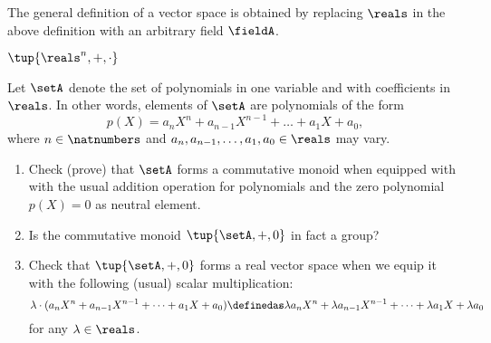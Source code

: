 \begin{remark}
    The general definition of a vector space is obtained by replacing $\reals$ in the above definition with an arbitrary field $\fieldA$.
\end{remark}

\begin{example}
    $\tup{\reals^n, +, \cdot}$
\end{example}



\begin{gradedexercise}
    \label{ex:real-polynomials}

    Let $\setA$ denote the set of polynomials in one variable and with coefficients in $\reals$.
    In other words, elements of $\setA$ are polynomials of the form
    \begin{equation}
        p(X) = a_nX^n + a_{n-1}X^{n-1} + \dots + a_1X + a_0,
    \end{equation}
    where $n \in \natnumbers$ and $a_n, a_{n-1}, \dots, a_1, a_0 \in \reals$ may vary.

    \begin{enumerate}
        \item Check (prove) that $\setA$ forms a commutative monoid when equipped with with the usual addition operation for polynomials and the zero polynomial $p(X) = 0$ as neutral element.
        \item Is the commutative monoid $\tup{\setA, +, 0}$ in fact a group?
        \item Check that $\tup{\setA, +, 0}$ forms a real vector space when we equip it with the following (usual) scalar multiplication:
              \begin{equation}
                  \lambda \cdot (a_nX^n + a_{n-1}
                  X^{n-1} + \dots + a_1X + a_0) \definedas \lambda a_nX^n + \lambda a_{n-1}X^{n-1} + \dots + \lambda a_1X + \lambda a_0
              \end{equation}
              for any $\lambda \in \reals$.
    \end{enumerate}
\end{gradedexercise}


